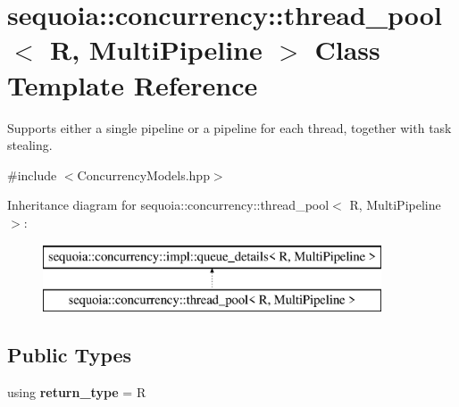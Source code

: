 \hypertarget{classsequoia_1_1concurrency_1_1thread__pool}{}\section{sequoia\+::concurrency\+::thread\+\_\+pool$<$ R, Multi\+Pipeline $>$ Class Template Reference}
\label{classsequoia_1_1concurrency_1_1thread__pool}


Supports either a single pipeline or a pipeline for each thread, together with task stealing.  




{\ttfamily \#include $<$Concurrency\+Models.\+hpp$>$}

Inheritance diagram for sequoia\+::concurrency\+::thread\+\_\+pool$<$ R, Multi\+Pipeline $>$\+:\begin{figure}[H]
\begin{center}
\leavevmode
\includegraphics[height=2.000000cm]{classsequoia_1_1concurrency_1_1thread__pool}
\end{center}
\end{figure}
\subsection*{Public Types}
\begin{DoxyCompactItemize}
\item 
\mbox{\label{classsequoia_1_1concurrency_1_1thread__pool_ad980e9997d55f253a7a0103a1e0ce49d}} 
using {\bfseries return\+\_\+type} = R
\end{DoxyCompactItemize}
